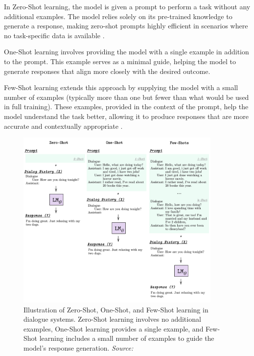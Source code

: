 In Zero-Shot learning, the model is given a prompt to perform a task without any additional examples. The model relies solely on its pre-trained knowledge to generate a response, making zero-shot prompts highly efficient in scenarios where no task-specific data is available \cite{radford2019language}.

One-Shot learning involves providing the model with a single example in addition to the prompt. This example serves as a minimal guide, helping the model to generate responses that align more closely with the desired outcome.

Few-Shot learning extends this approach by supplying the model with a small number of examples (typically more than one but fewer than what would be used in full training). These examples, provided in the context of the prompt, help the model understand the task better, allowing it to produce responses that are more accurate and contextually appropriate \cite{brown2020language}.

\begin{figure}[h]
    \centering
    \includegraphics[width=0.9\textwidth]{images/llms/zero-one-few-shots.png}
    \caption{Illustration of Zero-Shot, One-Shot, and Few-Shot learning in dialogue systems. Zero-Shot learning involves no additional examples, One-Shot learning provides a single example, and Few-Shot learning includes a small number of examples to guide the model's response generation. \textit{Source:} \cite{madotto2021few}}
    \label{fig:zero_one_few_shot}
\end{figure}

